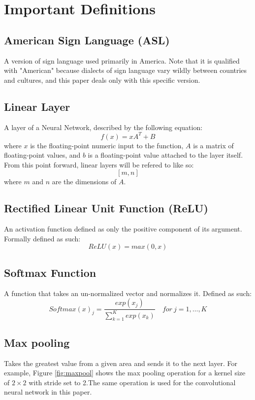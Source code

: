 \documentclass[10pt,Times New Roman]{article}
\begin{document}
\section{Important Definitions}
    \subsection{American Sign Language (ASL)}
        A version of sign language used primarily in America. Note that it is qualified with
        "American" because dialects of sign language vary wildly between countries and cultures,
        and this paper deals only with this specific version.

    \subsection{Linear Layer}\label{def:linearlayer}
        A layer of a Neural Network, described by the following equation:
        \[f(x) = xA^T + B\]
        where $x$ is the floating-point numeric input to the function, $A$ is a matrix of
        floating-point values, and $b$ is a floating-point value attached to the layer itself.
        From this point forward, linear layers will be refered to like so:
        \[[m,n]\]
        where $m$ and $n$ are the dimensions of $A$.

    \subsection{Rectified Linear Unit Function (ReLU)}
        An activation function defined as only the positive component of its argument. Formally
        defined as such:
        \[ReLU(x) = max(0,x)\]

    \subsection{Softmax Function}
        A function that takes an un-normalized vector and normalizes it. Defined as such:
        \[Softmax(x)_j = \frac{exp(x_j)}{\sum_{k=1}^K exp(x_k)}\quad for \ j=1,\ldots,K\]
    \subsection{Max pooling}
        Takes the greatest value from a given area and sends it to the next layer. For example,
        Figure \ref{fig:maxpool} shows the max pooling operation for a kernel size of $2\times2$ with
        stride set to 2.The same operation is used for the convolutional neural network in this paper.
\end{document}
